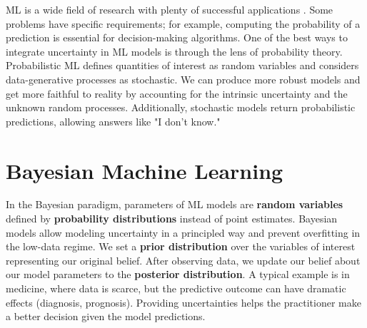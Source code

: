 

\ifpdf
    \graphicspath{{chapters/1_introduction/figures/}}
\else
    \graphicspath{{1_introduction/figures/EPS/}{1_introduction/figures/}}
\fi

\ac{ML} is a wide field of research with plenty of successful applications \cite{jordan2015machine}.
Some problems have specific requirements; for example, computing the probability of a prediction is essential for decision-making algorithms.
One of the best ways to integrate uncertainty in \ac{ML} models is through the lens of probability theory.
Probabilistic \ac{ML} defines quantities of interest as random variables and considers data-generative processes as stochastic.
We can produce more robust models and get more faithful to reality by accounting for the intrinsic uncertainty and the unknown random processes.
Additionally, stochastic models return probabilistic predictions, allowing answers like "I don't know."

\section{Bayesian Machine Learning}

In the Bayesian paradigm, parameters of \ac{ML} models are \textbf{random variables} defined by \textbf{probability distributions} instead of point estimates.
Bayesian models allow modeling uncertainty in a principled way and prevent overfitting in the low-data regime.
We set a \textbf{prior distribution} over the variables of interest representing our original belief.
After observing data, we update our belief about our model parameters to the \textbf{posterior distribution}.
A typical example is in medicine, where data is scarce, but the predictive outcome can have dramatic effects (diagnosis, prognosis).
Providing uncertainties helps the practitioner make a better decision given the model predictions.

